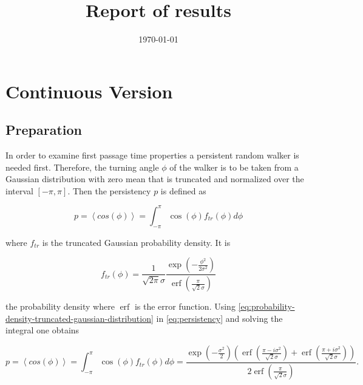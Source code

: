 \documentclass[]{scrartcl}
\title{Report of results}
\date{\today}
\DeclareMathOperator\erf{erf}
\begin{document}
\maketitle

\section{Continuous Version}
\label{sec:cont}

\subsection{Preparation}
\label{ssec:cont-prep}

In order to examine first passage time properties a persistent random walker is needed first. Therefore, the turning angle $\phi$ of the walker is to be taken from a Gaussian distribution with zero mean that is truncated and normalized over the interval $\left[-\pi, \pi\right]$. Then the persistency $p$ is defined as

\begin{equation}
 \label{eq:persistency}
 p = \left\langle cos\left(\phi\right)\right\rangle = \int_{-\pi}^{\pi} \cos\left(\phi\right) f_{tr}\left(\phi\right) d\phi
\end{equation}

where $f_{tr}$ is the truncated Gaussian probability density. It is

\begin{equation}
 \label{eq:probability-density-truncated-gaussian-distribution}
 f_{tr}\left(\phi\right) = \frac{1}{\sqrt{2\pi}\sigma} \frac{\exp\left(-\frac{\phi^2}{2\sigma^2}\right)}{\erf\left(\frac{\pi}{\sqrt{2}\sigma}\right)}
\end{equation}

the probability density where $\erf$ is the error function. Using \eqref{eq:probability-density-truncated-gaussian-distribution} in \eqref{eq:persistency} and solving the integral one obtains

\begin{equation}
 \label{eq:avg-cosine}
 p = \left\langle cos\left(\phi\right)\right\rangle = \int_{-\pi}^{\pi} \cos\left(\phi\right) f_{tr}\left(\phi\right) d\phi = \frac{\exp\left(-\frac{\sigma^2}{2}\right)\left(\erf\left(\frac{\pi - i \sigma^2}{\sqrt{2}\sigma}\right) + \erf\left(\frac{\pi + i \sigma^2}{\sqrt{2}\sigma}\right)\right)}{2\erf\left(\frac{\pi}{\sqrt{2}\sigma}\right)}.
\end{equation}
\end{document}

